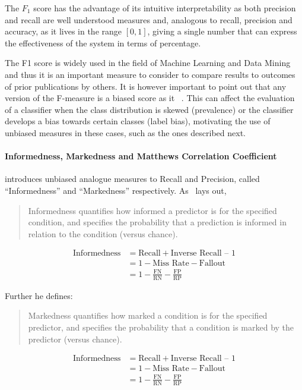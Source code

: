 The $F_1$ score has the advantage of its intuitive interpretability as both precision and recall are well understood measures and, analogous to recall, precision and accuracy, as it lives in the range $[0,1]$, giving a single number that can express the effectiveness of the system in terms of percentage.

The F1 score is widely used in the field of Machine Learning and Data Mining and thus it is an important measure to consider to compare results to outcomes of prior publications by others.
It is however important to point out that any version of the F-measure is a biased score as it ~\cite{Powers:2011aa}. This can affect the evaluation of a classifier when the class distribution is skewed (prevalence) or the classifier develops a bias towards certain classes (label bias), motivating the use of unbiased measures in these cases, such as the ones described next.

\paragraph{Informedness, Markedness and Matthews Correlation Coefficient}
\label{par:Informedness, Markedness and Matthews Correlation Coefficient}

\cite{Powers:2011aa} introduces unbiased analogue measures to Recall and Precision, called ``Informedness'' and ``Markedness'' respectively. As~\cite{Powers:2011aa} lays out, \blockquote{Informedness quantifies how informed a predictor is for the specified condition, and specifies the probability that a prediction is informed in relation to the condition (versus chance).}:

\begin{equation}
  \begin{split}
  \text{Informedness} &= \text{Recall} + \text{Inverse Recall} \text{ – } 1 \\
  &= 1 - \text{Miss Rate} - \text{Fallout} \\
  &= 1 - \frac{\text{FN}}{ \text{RN}} - \frac{\text{FP}}{\text{RP}}
  \end{split}
\end{equation}

Further he defines:
\blockquote{Markedness quantifies how marked a condition is for the specified predictor, and specifies the probability that a condition is marked by the predictor (versus chance).}

\begin{equation}
  \begin{split}
  \text{Informedness} &= \text{Recall} + \text{Inverse Recall} \text{ – } 1 \\
  &= 1 - \text{Miss Rate} - \text{Fallout} \\
  &= 1 - \frac{\text{FN}}{ \text{RN}} - \frac{\text{FP}}{\text{RP}}
  \end{split}
\end{equation}

